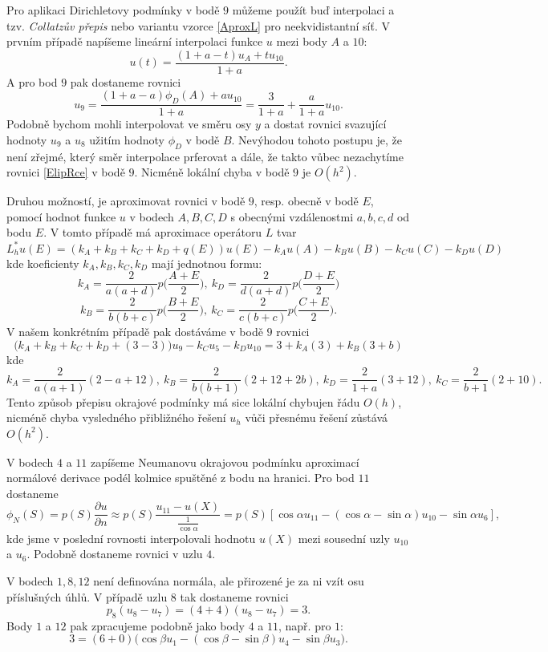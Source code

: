 \documentclass[a4paper,10pt]{article}
\def\prtl{\partial}                                        %
\begin{document}
Pro aplikaci Dirichletovy podmínky v bodě $9$ můžeme použít buď interpolaci a tzv. {\it Collatzův přepis} nebo
variantu vzorce \eqref{AproxL} pro neekvidistantní síť. V prvním případě napíšeme lineární interpolaci 
funkce $u$ mezi body $A$ a $10$:
\[
  u(t)=\frac{(1+a-t)u_A+tu_{10}}{1+a}.
\]
A pro bod $9$ pak dostaneme rovnici
\[
  u_9=\frac{(1+a-a)\phi_D(A)+au_{10}}{1+a}=\frac{3}{1+a}+\frac{a}{1+a} u_{10}.
\]
Podobně bychom mohli interpolovat ve směru osy $y$ a dostat rovnici svazující hodnoty $u_9$ a $u_8$ užitím
hodnoty $\phi_D$ v bodě $B$. Nevýhodou tohoto postupu je, že není zřejmé, který směr interpolace prferovat
a dále, že takto vůbec nezachytíme rovnici \eqref{ElipRce} v bodě $9$. Nicméně lokální chyba v bodě 
$9$ je $O(h^2)$.

Druhou možností, je aproximovat rovnici v bodě $9$, resp. obecně v bodě $E$, pomocí hodnot funkce $u$
v bodech $A,B,C,D$ s obecnými vzdálenostmi $a,b,c,d$ od bodu $E$. V tomto případě má aproximace operátoru $L$ 
tvar
\begin{equation}\label{aproxLneqiv}
  L_h^*u(E)=(k_A+k_B+k_C+k_D+q(E))u(E)-k_A u(A)-k_B u(B)-k_C u(C)-k_D u(D)
\end{equation}
kde koeficienty $k_A, k_B,k_C,k_D$ mají jednotnou formu:
\[
  k_A=\frac{2}{a(a+d)}p\Big(\frac{A+E}{2}\Big),\ k_D=\frac{2}{d(a+d)}p\Big(\frac{D+E}{2}\Big)
\]
\[
  k_B=\frac{2}{b(b+c)}p\Big(\frac{B+E}{2}\Big),\ k_C=\frac{2}{c(b+c)}p\Big(\frac{C+E}{2}\Big).
\]
V našem konkrétním případě pak dostáváme v bodě $9$ rovnici
\[
    \big(k_A+k_B+k_C+k_D+(3-3)\big)u_9-k_C u_5-k_D u_{10}=3+k_A(3)+k_B(3+b)
\]
kde
\[
  k_A=\frac{2}{a(a+1)}(2-a+12),\ k_B=\frac{2}{b(b+1)}(2+12+2b),
  \ k_D=\frac{2}{1+a}(3+12),\ k_C=\frac{2}{b+1}(2+10).
\]
Tento způsob přepisu okrajové podmínky má sice lokální chybujen řádu $O(h)$, nicméně chyba vysledného přibližného řešení $u_h$ vůči přesnému řešení zůstává $O(h^2)$.

V bodech $4$ a $11$ zapíšeme Neumanovu okrajovou podmínku aproximací normálové derivace podél kolmice 
spuštěné z bodu na hranici. Pro bod $11$ dostaneme
\[
  \phi_N(S)=p(S)\frac{\prtl u}{\prtl n}\approx p(S)\frac{u_{11}-u(X)}{\frac{1}{\cos\alpha}}=
  p(S)[\cos\alpha u_{11}-(\cos\alpha-\sin\alpha)u_{10}-\sin\alpha u_{6}],
\]
kde jsme v poslední rovnosti  interpolovali hodnotu $u(X)$ mezi sousední uzly $u_{10}$ a $u_6$. Podobně dostaneme rovnici v uzlu $4$. 

V bodech $1,8,12$ není definována normála, ale přirozené je za ni vzít osu příslušných úhlů.
V případě uzlu $8$ tak dostaneme rovnici
\[
  p_8(u_8-u_7)=(4+4)(u_8-u_7)=3.
\]
Body $1$ a $12$ pak zpracujeme podobně jako body $4$ a $11$, např. pro $1$:
\[
  3=(6+0)\big(\cos\beta u_1-(\cos\beta-\sin\beta)u_4-\sin\beta u_3\big).
\]
\end{document}
